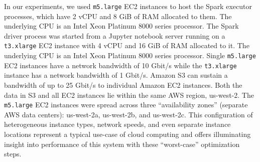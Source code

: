\documentclass[twocolumn, linenumbers]{aastex631}
\begin{document}
In our experiments, we used \texttt{m5.large} EC2 instances to host the Spark  executor processes, which have 2 vCPU and 8 GiB of RAM allocated to them. The underlying CPU is an Intel Xeon Platinum 8000 series processor. The Spark driver process was started from a Jupyter notebook server running on a \texttt{t3.xlarge} EC2 instance with 4 vCPU and 16 GiB of RAM allocated to it. The underlying CPU is an Intel Xeon Platinum 8000 series processor. Single \texttt{m5.large} EC2 instances have a network bandwidth of 10 Gbit/s while the \texttt{t3.xlarge} instance has a network bandwidth of 1 Gbit/s. Amazon S3 can sustain a bandwidth of up to 25 Gbit/s to individual Amazon EC2 instances. Both the data in S3 and all EC2 instances lie within the same AWS region, us-west-2. The \texttt{m5.large} EC2 instances were spread across three ``availability zones'' (separate AWS data centers): us-west-2a, us-west-2b, and us-west-2c. This configuration of heterogeneous instance types, network speeds, and even separate instance locations represent a typical use-case of cloud computing and offers illuminating insight into performance of this system with these ``worst-case'' optimization steps. 
\end{document}
